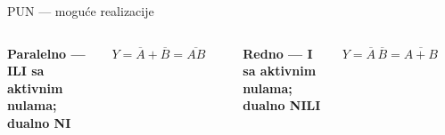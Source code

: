 \begin{frame}[label=09_1-s011]{PUN — moguće realizacije}\setlength{\parskip}{2pt}\setlength{\abovedisplayskip}{4pt}\setlength{\belowdisplayskip}{4pt}\setlength{\abovedisplayshortskip}{3pt}\setlength{\belowdisplayshortskip}{3pt}
\begin{columns}[T,onlytextwidth]\centering {}\textbf{Paralelno — ILI sa aktivnim nulama; dualno NI}\par $Y=\overline A+\overline B=\overline{AB}$\par\smallskip\begin{columns}[c,onlytextwidth]\centering {}\centering {}\centering \end{columns}
\textbf{Redno — I sa aktivnim nulama; dualno NILI}\par $Y=\overline A\,\overline B=\overline{A+B}$\par\smallskip\begin{columns}[c,onlytextwidth]\centering {}\centering {}\centering \end{columns}
\end{columns}
\end{frame}

